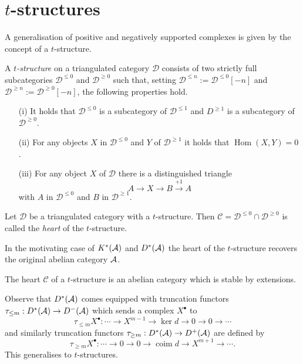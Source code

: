 \section{$t$-structures}
A generalisation of positive and negatively supported complexes is given by the concept of a $t$-structure.
\begin{definition}
 A {\it $t$-structure} on a triangulated category $\mathcal{D}$ consists of two strictly full subcategories $\mathcal{D}^{\leq 0}$ and $\mathcal{D}^{\geq 0}$ such that, setting $\mathcal{D}^{\leq n} := \mathcal{D}^{\leq 0}[-n]$ and $\mathcal{D}^{\geq n} := \mathcal{D}^{\geq 0} [-n]$, the following properties hold.
 \begin{enumerate}
   \item[(i)] It holds that $\mathcal{D}^{\leq 0}$ is a subcategory of $\mathcal{D}^{\leq 1}$ and $D^{\geq 1}$ is a subcategory of $\mathcal{D}^{\geq 0}$.
   \item[(ii)] For any objects $X$ in $\mathcal{D}^{\leq 0}$ and $Y$ of $\mathcal{D}^{\geq 1}$ it holds that $\operatorname{Hom}(X,Y) = 0$.
   \item[(iii)] For any object $X$ of $\mathcal{D}$ there is a distinguished triangle
   $$A \to X \to B \xrightarrow{+1} A $$
   with $A$ in $\mathcal{D}^{\leq 0}$ and $B$ in $\mathcal{D}^{\geq 1}$.
 \end{enumerate}
\end{definition}
\begin{definition}
 Let $\mathcal{D}$ be a triangulated category with a $t$-structure. Then $\mathcal{C} = \mathcal{D}^{\leq 0} \cap \mathcal{D}^{\geq 0}$ is called the {\it heart} of the $t$-structure.
\end{definition}
In the motivating case of $K^*(\AA)$ and $D^*(\AA)$ the heart of the $t$-structure recovers the original abelian category $\AA$.
\begin{proposition}{\cite[Proposition 5.1.2.]{dimca2004sheaves}}\label{prop: HeartExtension}
 The heart $\mathcal{C}$ of a $t$-structure is an abelian category which is stable by extensions.
\end{proposition}
Observe that $D^*(\AA)$ comes equipped with truncation functors
$\tau_{\leq m}:D^*(\AA)\to D^-(\AA)$ which sends a complex $X^\bullet$ to
$$\tau_{\leq m}X^\bullet : \cdots \to X^{m-1} \to \ker d \to 0 \to 0 \to \cdots$$
and similarly truncation functors $\tau_{\geq m}:D^*(\AA)\to D^{+}(\AA)$ are defined by
$$\tau_{\geq m}X^\bullet: \cdots \to 0 \to 0 \to \operatorname{coim} d \to X^{m+1}\to \cdots.$$
This generalises to $t$-structures.
